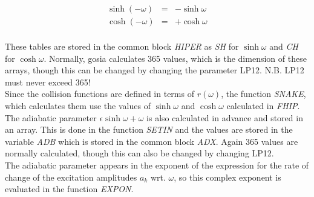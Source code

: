 \begin{eqnarray}
\sinh(-\omega) &=& -\sinh\omega\nonumber\\
\cosh(-\omega) &=& +\cosh\omega\nonumber\\
\end{eqnarray}

These tables are stored in the common block {\em HIPER} as {\em SH} for
$\sinh\omega$ and {\em CH} for $\cosh\omega$. Normally, gosia calculates 365
values, which is the dimension of these arrays, though this can be changed
by changing the parameter LP12. N.B. LP12 must never exceed 365!\\

Since the collision functions are defined in terms of $r(\omega)$, the
function {\em SNAKE}, which calculates them use the values of $\sinh\omega$
and $\cosh\omega$ calculated in {\em FHIP}.\\

The adiabatic parameter $\epsilon \sinh \omega + \omega$ is also calculated
in advance and stored in an array. This is done in the function {\em SETIN}
and the values are stored in the variable {\em ADB} which is stored in the
common block {\em ADX}. Again 365 values are normally calculated, though
this can also be changed by changing LP12.\\

The adiabatic parameter appears in the exponent of the expression for the
rate of change of the excitation amplitudes $a_k$ wrt. $\omega$, so this
complex exponent is evaluated in the function {\em EXPON}.
